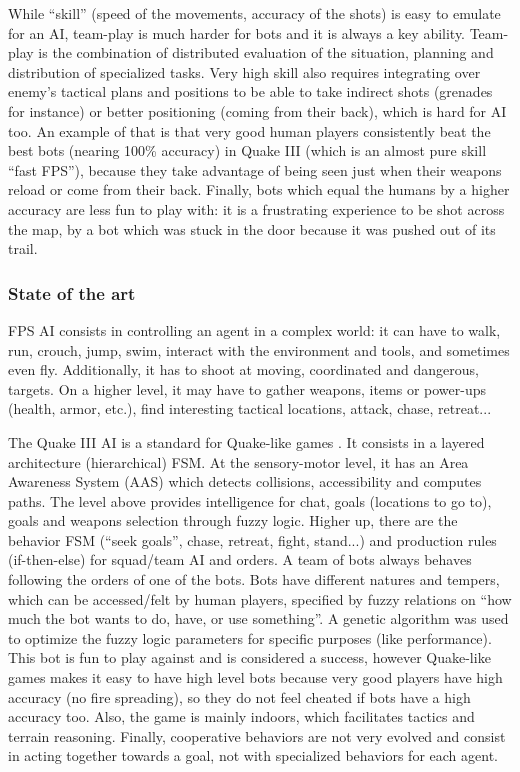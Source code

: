 While ``skill'' (speed of the movements, accuracy of the shots) is easy to emulate for an AI, team-play is much harder for bots and it is always a key ability. Team-play is the combination of distributed evaluation of the situation, planning and distribution of specialized tasks. Very high skill also requires integrating over enemy's tactical plans and positions to be able to take indirect shots (grenades for instance) or better positioning (coming from their back), which is hard for AI too. An example of that is that very good human players consistently beat the best bots (nearing 100\% accuracy) in Quake III (which is an almost pure skill ``fast FPS''), because they take advantage of being seen just when their weapons reload or come from their back. Finally, bots which equal the humans by a higher accuracy are less fun to play with: it is a frustrating experience to be shot across the map, by a bot which was stuck in the door because it was pushed out of its trail.

\subsubsection{State of the art}

FPS AI consists in controlling an agent in a complex world: it can have to walk, run, crouch, jump, swim, interact with the environment and tools, and sometimes even fly. Additionally, it has to shoot at moving, coordinated and dangerous, targets. %
On a higher level, it may have to gather weapons, items or power-ups (health, armor, etc.), find interesting tactical locations, attack, chase, retreat...

The Quake III AI is a standard for Quake-like games \citep{waveren-02-artificial}. It consists in a layered architecture (hierarchical) FSM. At the sensory-motor level, it has an Area Awareness System (AAS) which detects collisions, accessibility and computes paths. The level above provides intelligence for chat, goals (locations to go to), goals and weapons selection through fuzzy logic. Higher up, there are the behavior FSM (``seek goals'', chase, retreat, fight, stand...) and production rules (if-then-else) for squad/team AI and orders. A team of bots always behaves following the orders of one of the bots. Bots have different natures and tempers, which can be accessed/felt by human players, specified by fuzzy relations on ``how much the bot wants to do, have, or use something''. A genetic algorithm was used to optimize the fuzzy logic parameters for specific purposes (like performance). This bot is fun to play against and is considered a success, however Quake-like games makes it easy to have high level bots because very good players have high accuracy (no fire spreading), so they do not feel cheated if bots have a high accuracy too. Also, the game is mainly indoors, which facilitates tactics and terrain reasoning. Finally, cooperative behaviors are not very evolved and consist in acting together towards a goal, not with specialized behaviors for each agent.

